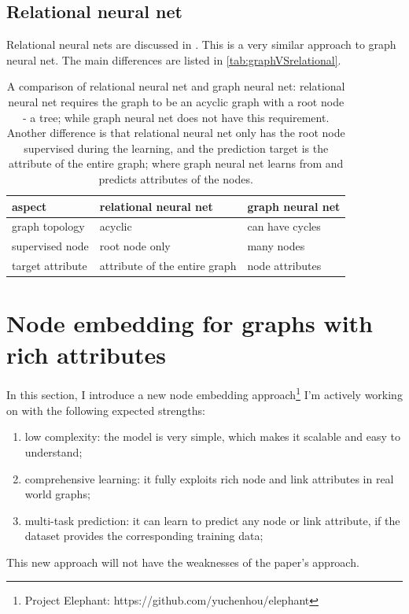 \documentclass{article}
\begin{document}
\subsection{Relational neural net}
Relational neural nets are discussed in \cite{uwents2011neural}. This is a very similar approach to graph neural net. The main differences are listed in \autoref{tab:graphVSrelational}.
\begin{table}[h]
	\centering
	\begin{tabularx}{\textwidth}{ |X|X|X| } \hline
		aspect  & relational neural net & graph neural net \\ \hline
		graph topology & acyclic & can have cycles \\ \hline
		supervised node & root node only & many nodes \\ \hline
		target attribute & attribute of the entire graph & node attributes \\ \hline
	\end{tabularx}
	\caption{A comparison of relational neural net and graph neural net: relational neural net requires the graph to be an acyclic graph with a root node - a tree; while graph neural net does not have this requirement. Another difference is that relational neural net only has the root node supervised during the learning, and the prediction target is the attribute of the entire graph; where graph neural net learns from and predicts attributes of the nodes.}
	\label{tab:graphVSrelational}
\end{table}

\section{Node embedding for graphs with rich attributes}
In this section, I introduce a new node embedding approach\footnote{Project Elephant: https://github.com/yuchenhou/elephant} I'm actively working on with the following expected strengths:
\begin{enumerate}
	\item low complexity: the model is very simple, which makes it scalable and easy to understand;
	\item comprehensive learning: it fully exploits rich node and link attributes in real world graphs;
	\item multi-task prediction: it can learn to predict any node or link attribute, if the dataset provides the corresponding training data;
\end{enumerate}
This new approach will not have the weaknesses of the paper's approach.
\end{document}
